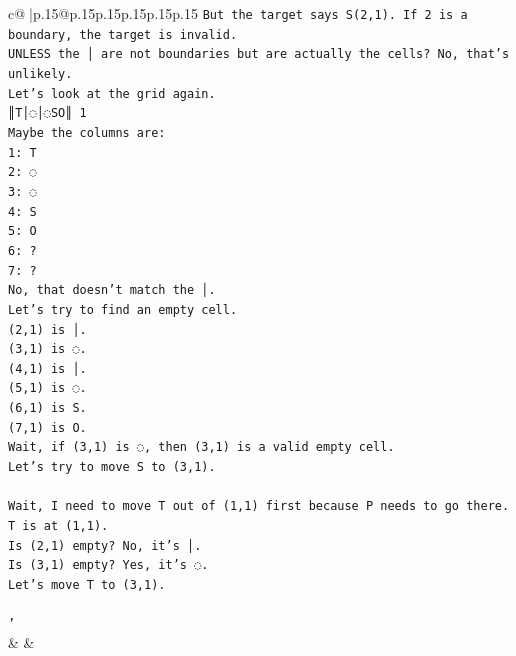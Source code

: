 \documentclass{article}
\begin{document}
{\begin{supertabular}{c@{$\;$}|p{.15\linewidth}@{}p{.15\linewidth}p{.15\linewidth}p{.15\linewidth}p{.15\linewidth}p{.15\linewidth}}
{{{\texttt{But the target says S(2,1). If 2 is a boundary, the target is invalid.} \\
\texttt{UNLESS the │ are not boundaries but are actually the cells? No, that's unlikely.} \\
\texttt{Let's look at the grid again.} \\
\texttt{║T│◌│◌SO║ 1} \\
\texttt{Maybe the columns are:} \\
\texttt{1: T} \\
\texttt{2: ◌} \\
\texttt{3: ◌} \\
\texttt{4: S} \\
\texttt{5: O} \\
\texttt{6: ?} \\
\texttt{7: ?} \\
\texttt{No, that doesn't match the │.} \\
\texttt{Let's try to find an empty cell.} \\
\texttt{(2,1) is │.} \\
\texttt{(3,1) is ◌.} \\
\texttt{(4,1) is │.} \\
\texttt{(5,1) is ◌.} \\
\texttt{(6,1) is S.} \\
\texttt{(7,1) is O.} \\
\texttt{Wait, if (3,1) is ◌, then (3,1) is a valid empty cell.} \\
\texttt{Let's try to move S to (3,1).} \\
\\ 
\texttt{Wait, I need to move T out of (1,1) first because P needs to go there.} \\
\texttt{T is at (1,1).} \\
\texttt{Is (2,1) empty? No, it's │.} \\
\texttt{Is (3,1) empty? Yes, it's ◌.} \\
\texttt{Let's move T to (3,1).} \\
\\ 
\texttt{'} \\
            }
        }
    }
    & & \\ \\


\end{supertabular}}
\end{document}
